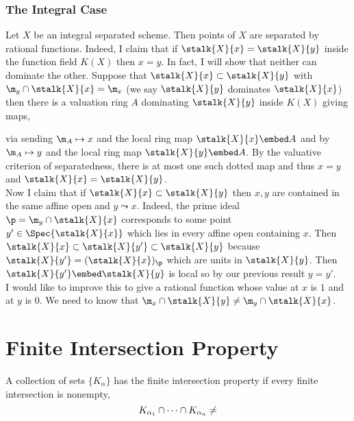 \documentclass[12pt]{article}
\begin{document}
\subsubsection{The Integral Case}

Let $X$ be an integral separated scheme. Then points of $X$ are separated by rational functions. Indeed, I claim that if $\stalk{X}{x} = \stalk{X}{y}$ inside the function field $K(X)$ then $x = y$. In fact, I will show that neither can dominate the other. Suppose that $\stalk{X}{x} \subset \stalk{X}{y}$ with $\m_y \cap \stalk{X}{x} = \m_x$ (we say $\stalk{X}{y}$ dominates $\stalk{X}{x}$) then there is a valuation ring $A$ dominating $\stalk{X}{y}$ inside $K(X)$ giving maps,
\begin{center}
\end{center}
via sending $\m_A \mapsto x$ and the local ring map $\stalk{X}{x} \embed A$ and by $\m_A \mapsto y$ and the local ring map $\stalk{X}{y} \embed A$. By the valuative criterion of separatedness, there is at most one such dotted map and thus $x = y$ and $\stalk{X}{x} = \stalk{X}{y}$.
\bigskip\\
Now I claim that if $\stalk{X}{x} \subset \stalk{X}{y}$ then $x,y$ are contained in the same affine open and $y \leadsto x$. Indeed, the prime ideal $\p = \m_y \cap \stalk{X}{x}$ corresponds to some point $y' \in \Spec{\stalk{X}{x}}$ which lies in every affine open containing $x$. Then $\stalk{X}{x} \subset \stalk{X}{y'} \subset \stalk{X}{y}$ because $\stalk{X}{y'} = (\stalk{X}{x})_\p$ which are units in $\stalk{X}{y}$. Then $\stalk{X}{y'} \embed \stalk{X}{y}$ is local so by our previous result $y = y'$.
\bigskip\\
I would like to improve this to give a rational function whose value at $x$ is $1$ and at $y$ is $0$. We need to know that $\m_x \cap \stalk{X}{y} \neq \m_y \cap \stalk{X}{x}$.

\section{Finite Intersection Property}

\begin{definition}
A collection of sets $\{ K_\alpha \}$ has the finite intersection property if every finite intersection is nonempty,
\[ K_{\alpha_1} \cap \cdots \cap K_{\alpha_n} \neq \empty \]
\end{definition}
\end{document}
